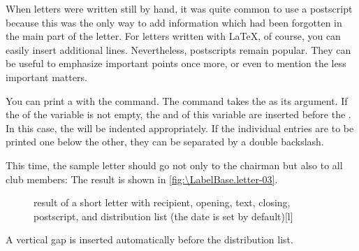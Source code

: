 \begin{Explain}
  When letters were written still by hand, it was quite common to use a
  postscript because this was the only way to add information which had been
  forgotten in the main part of the letter. For letters written with \LaTeX{},
  of course, you can easily insert additional lines. Nevertheless, postscripts
  remain popular. They can be useful to emphasize important points once more,
  or even to mention the less important matters.
\end{Explain}
%
\EndIndexGroup


\begin{Declaration}
\end{Declaration}
You can print a %
 with the  command. The
command takes the  as its argument. If the
 of the variable
 is not empty, the
 and  of this variable are inserted before the
. In this case, the  will be
indented appropriately. If the individual entries are to be printed one below
the other, they can be separated by a double backslash.
\begin{Example}
  This time, the sample letter should go not only to the chairman but also to
  all club members:
  The result is shown in \autoref{fig:\LabelBase.letter-03}.
  \begin{figure}
    \setcapindent{0pt}%
    \begin{captionbeside}{%
        result of a short letter with recipient, opening, text, closing,
        postscript, and distribution list (the date is set by default)}[l]
    \end{captionbeside}
    \label{fig:\LabelBase.letter-03}
  \end{figure}
\end{Example}
A vertical gap is inserted automatically before the distribution list.%
%
\EndIndexGroup



